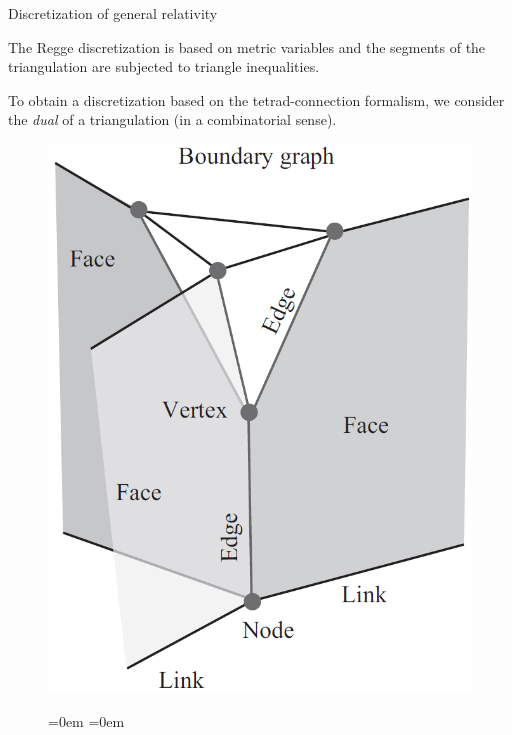 \documentclass[12pt,titlepage]{article}
\begin{document}
\begin{frame}{Discretization of general relativity}
    \begin{list}{\,}{\leftmargin=1em \itemindent=0em}
        \item<1-> The Regge discretization is based on metric variables and the segments of the triangulation are subjected to triangle inequalities.
        \item<2-> To obtain a discretization based on the tetrad-connection formalism, we consider the \textit{dual} of a triangulation (in a combinatorial sense). 
        \item<3-> \noindent\FloatBarrier
        \begin{figure}[!ht]
            \begin{minipage}{0.3\linewidth}
                \includegraphics[width=\linewidth]{4.6}
            \end{minipage}
            \begin{minipage}{0.7\linewidth}
                \begin{itemize}{\leftmargin=0em \itemindent=0em}

\end{itemize}
\end{minipage}
\end{figure}
\end{list}
\end{frame}
\end{document}

